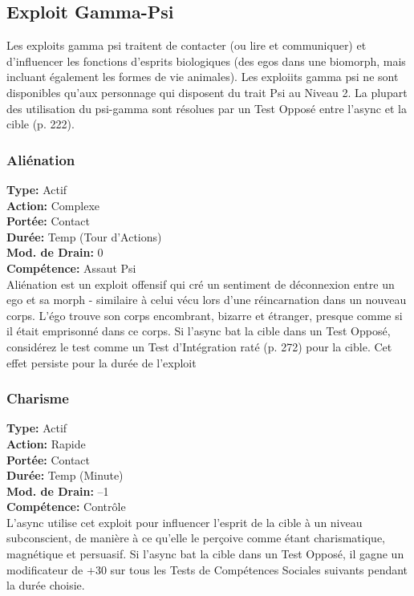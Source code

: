 \subsection{Exploit Gamma-Psi} Les exploits gamma psi traitent de contacter (ou lire et communiquer) et d'influencer les fonctions d'esprits biologiques (des egos dans une biomorph, mais incluant également les formes de vie animales). Les exploiits gamma psi ne sont disponibles qu'aux personnage qui disposent du trait Psi au Niveau 2. La plupart des utilisation du psi-gamma sont résolues par un Test Opposé entre l'async et la cible (p. 222). 

\subsubsection{Aliénation} \textbf{Type:} Actif \\ \textbf{Action:} Complexe \\ \textbf{Portée:} Contact \\ \textbf{Durée:} Temp (Tour d'Actions) \\ \textbf{Mod. de Drain:} 0 \\ \textbf{Compétence:} Assaut Psi \\ Aliénation est un exploit offensif qui cré un sentiment de déconnexion entre un ego et sa morph - similaire à celui vécu lors d'une réincarnation dans un nouveau corps. L'égo trouve son corps encombrant, bizarre et étranger, presque comme si il était emprisonné dans ce corps. Si l'async bat la cible dans un Test Opposé, considérez le test comme un Test d'Intégration raté (p. 272) pour la cible. Cet effet persiste pour la durée de l'exploit 

\subsubsection{Charisme} \textbf{Type:} Actif \\ \textbf{Action:} Rapide \\ \textbf{Portée:} Contact \\ \textbf{Durée:} Temp (Minute) \\ \textbf{Mod. de Drain:} –1 \\ \textbf{Compétence:} Contrôle \\ L'async utilise cet exploit pour influencer l'esprit de la cible à un niveau subconscient, de manière à ce qu'elle le perçoive comme étant charismatique, magnétique et persuasif. Si l'async bat la cible dans un Test Opposé, il gagne un modificateur de +30 sur tous les Tests de Compétences Sociales suivants pendant la durée choisie. 

